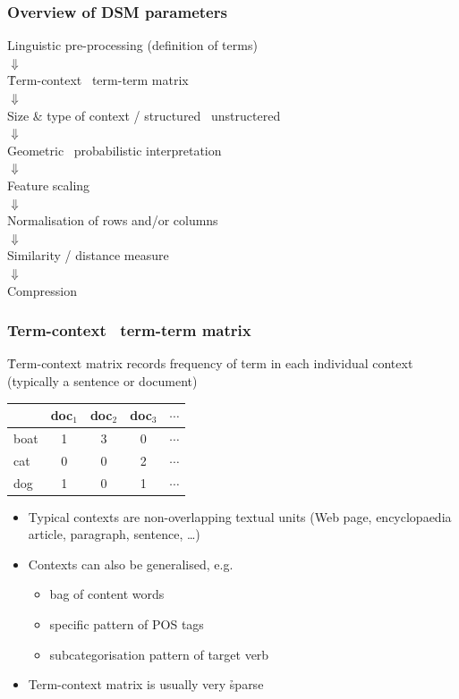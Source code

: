 \begin{frame}
  \frametitle{Overview of DSM parameters}

  \ungap[1]
  \begin{center}
    Linguistic pre-processing (definition of terms)\\
    $\Downarrow$\\
    \h{Term-context \vs\ term-term matrix}\\
    $\Downarrow$\\
    Size \& type of context / structured \vs\ unstructered\\
    $\Downarrow$\\
    Geometric \vs\ probabilistic interpretation\\
    $\Downarrow$\\
    Feature scaling\\
    $\Downarrow$\\
    Normalisation of rows and/or columns\\
    $\Downarrow$\\
    Similarity / distance measure\\
    $\Downarrow$\\
    Compression
  \end{center}
\end{frame}

\begin{frame}
  \frametitle{Term-context \vs\ term-term matrix}

  \h{Term-context matrix} records frequency of term in each individual context (typically a sentence or document)
  \begin{center}
    \begin{tabular}{l|c|c|c|c}
      & doc$_1$ & doc$_2$ & doc$_3$ & $\cdots$ \\
      \hline
      boat & 1 & 3 & 0 & $\cdots$ \\
      \hline
      cat  & 0 & 0 & 2 & $\cdots$ \\
      \hline
      dog  & 1 & 0 & 1 & $\cdots$ \\
      \hline
    \end{tabular}
  \end{center}
  
  \begin{itemize}
  \item Typical contexts are non-overlapping textual units (Web page, encyclopaedia article, paragraph, sentence, \ldots)
  \item<2-> Contexts can also be generalised, e.g.
    \begin{itemize}
    \item bag of content words
    \item specific pattern of POS tags
    \item subcategorisation pattern of target verb
    \end{itemize}
  \item<2-> Term-context matrix is usually very \h{sparse}
  \end{itemize}
\end{frame}

